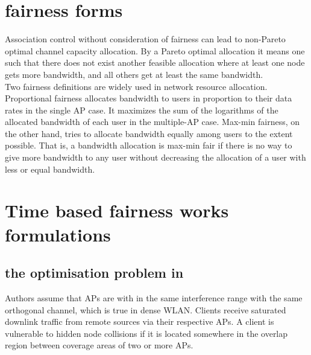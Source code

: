 \documentclass[journal,transmag]{IEEEtran}
\begin{document}
\section{fairness forms}

Association control without consideration of fairness can lead to non-Pareto optimal channel capacity allocation. By a Pareto optimal allocation it means one such that there does not exist
another feasible allocation where at least one node gets more bandwidth, and all others get at least the same bandwidth. \cite{06proportional_fairness_3G_networks} \\

Two fairness definitions are widely used in network resource allocation. Proportional fairness allocates bandwidth to users in proportion to their data rates in the single AP case. It maximizes the sum of the logarithms of the allocated bandwidth of each user in the multiple-AP case. Max-min
fairness, on the other hand, tries to allocate bandwidth equally among users to the extent possible. That is, a bandwidth allocation is max-min fair if there is no way to give more bandwidth to any user without decreasing the allocation of a user with less or equal bandwidth.\cite{06proportional_fairness_3G_networks}\\

\section{Time based fairness works formulations}
\subsection{the optimisation problem in \cite{14optimalAP_INFOCOM}}
\label{optimisation problems}
Authors assume that APs are with in the same interference range with the same orthogonal channel, which is true in dense WLAN. Clients receive saturated downlink traffic from remote sources via their respective APs. A client is vulnerable to hidden node collisions if it is located somewhere in the overlap region between coverage areas of two or more APs. \cite{14throughput_optimisation_AP_association_interefrence} \\
\end{document}
